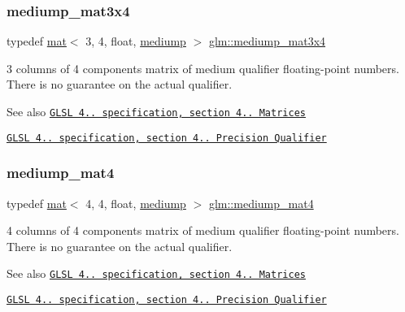\subsubsection{\texorpdfstring{mediump\+\_\+mat3x4}{mediump\_mat3x4}}
{\footnotesize\ttfamily typedef \hyperlink{structglm_1_1mat}{mat}$<$ 3, 4, float, \hyperlink{namespaceglm_a36ed105b07c7746804d7fdc7cc90ff25a6416f3ea0c9025fb21ed50c4d6620482}{mediump} $>$ \hyperlink{group__core__precision_ga61dd8c2c7fd60c1343a6b3aca7f86c25}{glm\+::mediump\+\_\+mat3x4}}

3 columns of 4 components matrix of medium qualifier floating-\/point numbers. There is no guarantee on the actual qualifier.

\begin{DoxySeeAlso}{See also}
\href{http://www.opengl.org/registry/doc/GLSLangSpec.4.20.8.pdf}{\tt G\+L\+SL 4.. specification, section 4.. Matrices} 

\href{http://www.opengl.org/registry/doc/GLSLangSpec.4.20.8.pdf}{\tt G\+L\+SL 4.. specification, section 4.. Precision Qualifier} 
\end{DoxySeeAlso}
\mbox{\label{group__core__precision_ga0987ea03f27d035ebd79fd71ca394be1}} 
\subsubsection{\texorpdfstring{mediump\+\_\+mat4}{mediump\_mat4}}
{\footnotesize\ttfamily typedef \hyperlink{structglm_1_1mat}{mat}$<$ 4, 4, float, \hyperlink{namespaceglm_a36ed105b07c7746804d7fdc7cc90ff25a6416f3ea0c9025fb21ed50c4d6620482}{mediump} $>$ \hyperlink{group__core__precision_ga0987ea03f27d035ebd79fd71ca394be1}{glm\+::mediump\+\_\+mat4}}

4 columns of 4 components matrix of medium qualifier floating-\/point numbers. There is no guarantee on the actual qualifier.

\begin{DoxySeeAlso}{See also}
\href{http://www.opengl.org/registry/doc/GLSLangSpec.4.20.8.pdf}{\tt G\+L\+SL 4.. specification, section 4.. Matrices} 

\href{http://www.opengl.org/registry/doc/GLSLangSpec.4.20.8.pdf}{\tt G\+L\+SL 4.. specification, section 4.. Precision Qualifier} 
\end{DoxySeeAlso}
\mbox{\label{group__core__precision_gaf0c9bd4c952160fa6f63ae8ab243beea}} 
